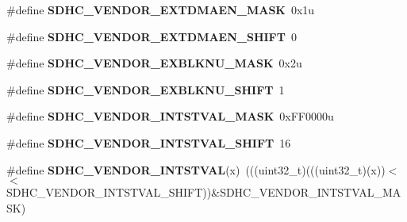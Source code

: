 \begin{DoxyCompactItemize}
\item 
\#define {\bfseries S\+D\+H\+C\+\_\+\+V\+E\+N\+D\+O\+R\+\_\+\+E\+X\+T\+D\+M\+A\+E\+N\+\_\+\+M\+A\+SK}~0x1u\hypertarget{group__SDHC__Register__Masks_ga83921c53d734582d4faefacf105dab13}{}\label{group__SDHC__Register__Masks_ga83921c53d734582d4faefacf105dab13}

\item 
\#define {\bfseries S\+D\+H\+C\+\_\+\+V\+E\+N\+D\+O\+R\+\_\+\+E\+X\+T\+D\+M\+A\+E\+N\+\_\+\+S\+H\+I\+FT}~0\hypertarget{group__SDHC__Register__Masks_ga983ed2560d2e6ab70865f447d0519d07}{}\label{group__SDHC__Register__Masks_ga983ed2560d2e6ab70865f447d0519d07}

\item 
\#define {\bfseries S\+D\+H\+C\+\_\+\+V\+E\+N\+D\+O\+R\+\_\+\+E\+X\+B\+L\+K\+N\+U\+\_\+\+M\+A\+SK}~0x2u\hypertarget{group__SDHC__Register__Masks_gaa0a0cbb02b6172ad044e259017665d02}{}\label{group__SDHC__Register__Masks_gaa0a0cbb02b6172ad044e259017665d02}

\item 
\#define {\bfseries S\+D\+H\+C\+\_\+\+V\+E\+N\+D\+O\+R\+\_\+\+E\+X\+B\+L\+K\+N\+U\+\_\+\+S\+H\+I\+FT}~1\hypertarget{group__SDHC__Register__Masks_gafc7b41b0f492ed43f488063697000cf3}{}\label{group__SDHC__Register__Masks_gafc7b41b0f492ed43f488063697000cf3}

\item 
\#define {\bfseries S\+D\+H\+C\+\_\+\+V\+E\+N\+D\+O\+R\+\_\+\+I\+N\+T\+S\+T\+V\+A\+L\+\_\+\+M\+A\+SK}~0x\+F\+F0000u\hypertarget{group__SDHC__Register__Masks_ga59d8694a1bf1d55be388439ed4419ab3}{}\label{group__SDHC__Register__Masks_ga59d8694a1bf1d55be388439ed4419ab3}

\item 
\#define {\bfseries S\+D\+H\+C\+\_\+\+V\+E\+N\+D\+O\+R\+\_\+\+I\+N\+T\+S\+T\+V\+A\+L\+\_\+\+S\+H\+I\+FT}~16\hypertarget{group__SDHC__Register__Masks_ga3610161a11c6ef0ef2849ef4fca8d12f}{}\label{group__SDHC__Register__Masks_ga3610161a11c6ef0ef2849ef4fca8d12f}

\item 
\#define {\bfseries S\+D\+H\+C\+\_\+\+V\+E\+N\+D\+O\+R\+\_\+\+I\+N\+T\+S\+T\+V\+AL}(x)~(((uint32\+\_\+t)(((uint32\+\_\+t)(x))$<$$<$S\+D\+H\+C\+\_\+\+V\+E\+N\+D\+O\+R\+\_\+\+I\+N\+T\+S\+T\+V\+A\+L\+\_\+\+S\+H\+I\+FT))\&S\+D\+H\+C\+\_\+\+V\+E\+N\+D\+O\+R\+\_\+\+I\+N\+T\+S\+T\+V\+A\+L\+\_\+\+M\+A\+SK)\hypertarget{group__SDHC__Register__Masks_ga760d0546097587595fec8f13765b6b2e}{}\label{group__SDHC__Register__Masks_ga760d0546097587595fec8f13765b6b2e}


\end{DoxyCompactItemize}
